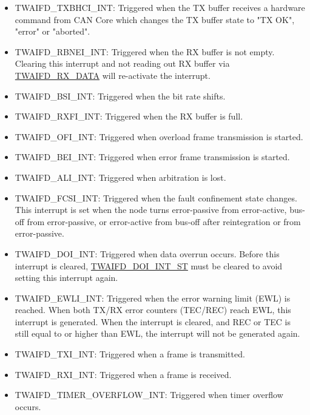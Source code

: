 \documentclass[main\_\_EN.tex]{subfiles}
\begin{document}
\begin{itemize}
    \item \label{int:TWAIFDTXBHCIINT}TWAIFD\_TXBHCI\_INT: Triggered when the TX buffer receives a hardware command from CAN Core which changes the TX buffer state to "TX OK", "error" or "aborted".
    \item \label{int:TWAIFDRBNEIINT}TWAIFD\_RBNEI\_INT: Triggered when the RX buffer is not empty. Clearing this interrupt and not reading out RX buffer via \hyperref[regdesc:TWAIFDRXDATAREG]{TWAIFD\_RX\_DATA} will re-activate the interrupt.
    \item \label{int:TWAIFDBSIINT}TWAIFD\_BSI\_INT: Triggered when the bit rate shifts.
    \item \label{int:TWAIFDRXFIINT}TWAIFD\_RXFI\_INT: Triggered when the RX buffer is full.
    \item \label{int:TWAIFDOFIINT}TWAIFD\_OFI\_INT: Triggered when overload frame transmission is started.
    \item \label{int:TWAIFDBEIINT}TWAIFD\_BEI\_INT: Triggered when error frame transmission is started.
    \item \label{int:TWAIFDALIINT}TWAIFD\_ALI\_INT: Triggered when arbitration is lost.
    \item \label{int:TWAIFDFCSIINT}TWAIFD\_FCSI\_INT: Triggered when the fault confinement state changes. This interrupt is set when the node turns error-passive from error-active, bus-off from error-passive, or error-active from bus-off after reintegration or from error-passive.
    \item \label{int:TWAIFDDOIINT}TWAIFD\_DOI\_INT: Triggered when data overrun occurs. Before this interrupt is cleared, \hyperref[fielddesc:TWAIFDDOIINTST]{TWAIFD\_DOI\_INT\_ST} must be cleared to avoid setting this interrupt again.
    \item \label{int:TWAIFDEWLIINT}TWAIFD\_EWLI\_INT: Triggered when the error warning limit (EWL) is reached. When both TX/RX error counters (TEC/REC) reach EWL, this interrupt is generated. When the interrupt is cleared, and REC or TEC is still equal to or higher than EWL, the interrupt will not be generated again.
    \item \label{int:TWAIFDTXIINT}TWAIFD\_TXI\_INT: Triggered when a frame is transmitted.
    \item \label{int:TWAIFDRXIINT}TWAIFD\_RXI\_INT: Triggered when a frame is received.
    \item \label{int:TWAIFDTIMEROVERFLOWINT}TWAIFD\_TIMER\_OVERFLOW\_INT: Triggered when timer overflow occurs.
\end{itemize}
\end{document}

